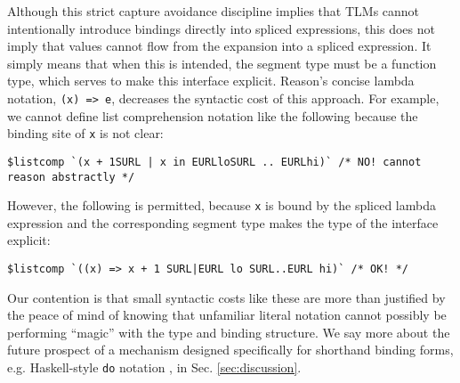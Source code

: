 \documentclass[acmsmall]{acmart}
\newcommand{\li}[1]{\lstinline[basicstyle=\ttfamily\fontsize{9pt}{1em}\selectfont]{#1}}
\begin{document}

Although this strict capture avoidance discipline implies that TLMs cannot intentionally introduce  bindings directly into spliced expressions, this does not imply that values cannot flow from the expansion into a spliced expression. It simply means that when this is intended, the segment type must be a function type, which serves to make this interface explicit. Reason's concise lambda notation, \li{(x) => e}, decreases the syntactic cost of this approach. For example, we cannot define list comprehension notation like the following because the binding site of \li{x} is not clear:
\begin{lstlisting}[numbers=none,deletekeywords={in}]
  $listcomp `(x + 1SURL | x in EURLloSURL .. EURLhi)` /* NO! cannot reason abstractly */
\end{lstlisting}
However, the following is permitted, because \li{x} is bound by the spliced lambda expression and the corresponding segment type makes the type of the interface explicit:
\begin{lstlisting}[numbers=none]
  $listcomp `((x) => x + 1 SURL|EURL lo SURL..EURL hi)` /* OK! */
\end{lstlisting}

Our contention is that small syntactic costs like these are more than justified by the peace of mind of knowing that unfamiliar literal notation cannot possibly be performing ``magic'' with the type and binding structure. We say more about the future prospect of a  mechanism designed specifically for shorthand binding forms, e.g. Haskell-style \li{do} notation \cite{jones2003haskell}, in Sec. \ref{sec:discussion}.%



\end{document}
